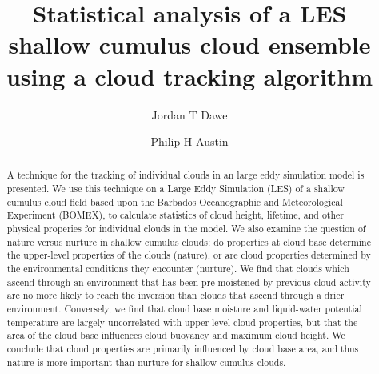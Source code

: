 \documentclass[acp]{copernicus}
\begin{document}
\title{Statistical analysis of a LES shallow cumulus cloud ensemble using a 
cloud tracking algorithm}


\author[1]{Jordan T Dawe}
\author[1]{Philip H Austin}










\received{}
\pubdiscuss{} %
\revised{}
\accepted{}
\published{}




\maketitle



\begin{abstract}
A technique for the tracking of individual clouds in an large eddy simulation 
model is presented.  We use this technique on a Large Eddy Simulation (LES) of 
a shallow cumulus cloud field based upon the Barbados Oceanographic and 
Meteorological Experiment (BOMEX), to calculate statistics of cloud height, 
lifetime, and other physical properies for individual clouds in the model.  We 
also examine the question of nature versus nurture in shallow cumulus clouds: 
do properties at cloud base determine the upper-level properties of the clouds 
(nature), or are cloud properties determined by the environmental conditions 
they encounter (nurture).  We find that clouds which ascend through an 
environment that has been pre-moistened by previous cloud activity are no more 
likely to reach the inversion than clouds that ascend through a drier 
environment.  Conversely, we find that cloud base moisture and liquid-water 
potential temperature are largely uncorrelated with upper-level cloud 
properties, but that the area of the cloud base influences cloud buoyancy and 
maximum cloud height.  We conclude that cloud properties are primarily 
influenced by cloud base area, and thus nature is more important than nurture 
for shallow cumulus clouds.
\end{abstract}
\end{document}
